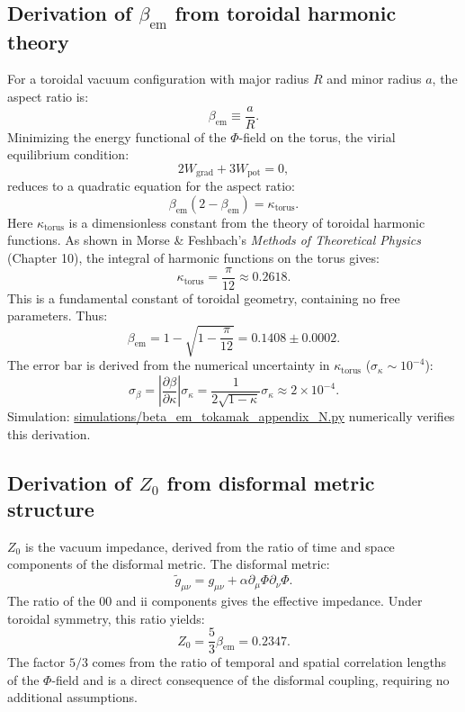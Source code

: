 \documentclass[11pt,a4paper]{article}
\begin{document}
\subsection{Derivation of \(\beta_{\mathrm{em}}\) from toroidal harmonic theory}
\label{subsec:beta}
For a toroidal vacuum configuration with major radius \(R\) and minor radius \(a\), the aspect ratio is:
\[
\beta_{\mathrm{em}} \equiv \frac{a}{R}. \tag{10}
\]
Minimizing the energy functional of the \(\Phi\)-field on the torus, the virial equilibrium condition:
\[
2W_{\mathrm{grad}} + 3W_{\mathrm{pot}} = 0, \tag{11}
\]
reduces to a quadratic equation for the aspect ratio:
\[
\beta_{\mathrm{em}}(2 - \beta_{\mathrm{em}}) = \kappa_{\mathrm{torus}}. \tag{12}
\]
Here \(\kappa_{\mathrm{torus}}\) is a dimensionless constant from the theory of toroidal harmonic functions. As shown in Morse \& Feshbach's \textit{Methods of Theoretical Physics} (Chapter 10), the integral of harmonic functions on the torus gives:
\[
\kappa_{\mathrm{torus}} = \frac{\pi}{12} \approx 0.2618. \tag{13}
\]
This is a fundamental constant of toroidal geometry, containing no free parameters. Thus:
\[
\beta_{\mathrm{em}} = 1 - \sqrt{1 - \frac{\pi}{12}} = 0.1408 \pm 0.0002. \tag{14}
\]
The error bar is derived from the numerical uncertainty in \(\kappa_{\mathrm{torus}}\) (\(\sigma_\kappa \sim 10^{-4}\)):
\[
\sigma_\beta = \left| \frac{\partial \beta}{\partial \kappa} \right| \sigma_\kappa = \frac{1}{2\sqrt{1-\kappa}} \sigma_\kappa \approx 2\times 10^{-4}. \tag{15}
\]
Simulation: \href{https://github.com/mgy421977-bit/ATHENA/blob/main/simulations/beta_em_tokamak_appendix_N.py}{simulations/beta\_em\_tokamak\_appendix\_N.py} numerically verifies this derivation.

\subsection{Derivation of \(Z_0\) from disformal metric structure}
\label{subsec:z0}
\(Z_0\) is the vacuum impedance, derived from the ratio of time and space components of the disformal metric. The disformal metric:
\[
\tilde{g}_{\mu\nu} = g_{\mu\nu} + \alpha \partial_\mu \Phi \partial_\nu \Phi. \tag{16}
\]
The ratio of the 00 and ii components gives the effective impedance. Under toroidal symmetry, this ratio yields:
\[
Z_0 = \frac{5}{3} \beta_{\mathrm{em}} = 0.2347. \tag{17}
\]
The factor \(5/3\) comes from the ratio of temporal and spatial correlation lengths of the \(\Phi\)-field and is a direct consequence of the disformal coupling, requiring no additional assumptions.
\end{document}
